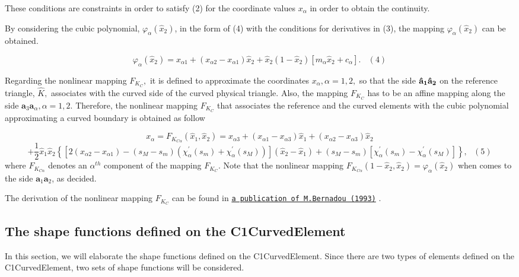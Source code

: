 These conditions are constraints in order to satisfy (2) for the coordinate values $ x_{\alpha} $ in order to obtain the continuity.

By considering the cubic polynomial, $ \varphi_{\alpha}(\hat{x}_2) $, in the form of (4) with the conditions for derivatives in (3), the mapping $ \varphi_{\alpha}(\hat{x}_2) $ can be obtained.

\[ \varphi_{\alpha}(\hat{x}_2) = x_{\alpha 1} + (x_{\alpha 2} - x_{\alpha 1})\hat{x}_{2} + \hat{x}_{2}(1-\hat{x}_{2})[m_{\alpha}\hat{x}_{2}+c_{\alpha}]. \ \ \ \ (4) \]

Regarding the nonlinear mapping $ F_{K_{C}}, $ it is defined to approximate the coordinates $ x_{\alpha}, \alpha = 1,2, $ so that the side $ \bf{\hat{a}}_1\bf{\hat{a}}_2 $ on the reference triangle, $ \hat{K}, $ associates with the curved side of the curved physical triangle. Also, the mapping $ F_{K_{C}} $ has to be an affine mapping along the side $ \mathbf{a}_{3}\mathbf{a}_{\alpha}, \alpha = 1,2 $. Therefore, the nonlinear mapping $ F_{K_{C}} $ that associates the reference and the curved elements with the cubic polynomial approximating a curved boundary is obtained as follow

\[ x_{\alpha} = F_{K_{C\alpha}}(\hat{x}_{1},\hat{x}_{2}) = x_{\alpha 3} + ( x_{\alpha 1} - x_{\alpha 3} )\hat{x}_{1} + (x_{\alpha 2} - x_{\alpha 3})\hat{x}_{2} \] \[ + \frac{1}{2}\hat{x}_{1}\hat{x}_{2}\left\{\left[2(x_{\alpha 2}-x_{\alpha 1})-(s_{M}-s_{m})(\chi^{\prime}_{\alpha}(s_{m}) +\chi^{\prime}_{\alpha}(s_{M}))\right](\hat{x}_{2}-\hat{x}_{1} ) + (s_{M}-s_{m})\left[\chi^{\prime}_{\alpha}(s_{m}) -\chi^{\prime}_{\alpha}(s_{M})\right]\right\}, \ \ \ (5)\] where $ F_{K_{C\alpha}} $ denotes an $\alpha^{th} $ component of the mapping $ F_{K_{C}} $. Note that the nonlinear mapping $ F_{K_{C\alpha}}(1-\hat{x}_{2},\hat{x}_{2}) = \varphi_{\alpha}(\hat{x}_{2}) $ when comes to the side $ \mathbf{a}_{1}\mathbf{a}_{2} $, as decided.

The derivation of the nonlinear mapping $ F_{K_{C}} $ can be found in \href{http://www.sciencedirect.com/science?_ob=MiamiImageURL&_cid=271868&_user=6991156&_pii=004578259390111A&_check=y&_origin=article&_zone=toolbar&_coverDate=31-Jan-1993&view=c&originContentFamily=serial&wchp=dGLzVlV-zSkzk&md5=d038a1aec18c25806e39c26187c2a200&pid=1-s2.0-004578259390111A-main.pdf}{\tt a publication of M.\+Bernadou (1993)} .



\hypertarget{index_c1_shape}{}\subsection{The shape functions defined on the C1\+Curved\+Element}\label{index_c1_shape}
In this section, we will elaborate the shape functions defined on the {\ttfamily C1\+Curved\+Element}. Since there are two types of elements defined on the {\ttfamily C1\+Curved\+Element}, two sets of shape functions will be considered.


